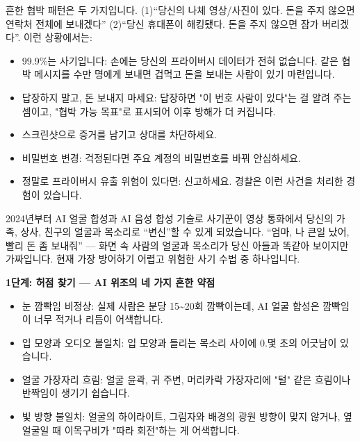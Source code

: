 
흔한 협박 패턴은 두 가지입니다. (1)“당신의 나체 영상/사진이 있다. 돈을 주지 않으면 연락처 전체에 보내겠다” (2)“당신 휴대폰이 해킹됐다. 돈을 주지 않으면 잠가 버리겠다”. 이런 상황에서는:

\begin{itemize}
  \item 99.9\%는 사기입니다: 손에는 당신의 프라이버시 데이터가 전혀 없습니다. 같은 협박 메시지를 수만 명에게 보내면 겁먹고 돈을 보내는 사람이 있기 마련입니다.
  \item 답장하지 말고, 돈 보내지 마세요: 답장하면 "이 번호 사람이 있다"는 걸 알려 주는 셈이고, "협박 가능 목표"로 표시되어 이후 방해가 더 커집니다.
  \item 스크린샷으로 증거를 남기고 상대를 차단하세요.
  \item 비밀번호 변경: 걱정된다면 주요 계정의 비밀번호를 바꿔 안심하세요.
  \item 정말로 프라이버시 유출 위험이 있다면: 신고하세요. 경찰은 이런 사건을 처리한 경험이 있습니다.
\end{itemize}


2024년부터 AI 얼굴 합성과 AI 음성 합성 기술로 사기꾼이 영상 통화에서 당신의 가족, 상사, 친구의 얼굴과 목소리로 “변신”할 수 있게 되었습니다. “엄마, 나 큰일 났어, 빨리 돈 좀 보내줘” — 화면 속 사람의 얼굴과 목소리가 당신 아들과 똑같아 보이지만 가짜입니다. 현재 가장 방어하기 어렵고 위험한 사기 수법 중 하나입니다.

\textbf{1단계: 허점 찾기 — AI 위조의 네 가지 흔한 약점}\par

\begin{itemize}
  \item 눈 깜빡임 비정상: 실제 사람은 분당 15\textasciitilde{}20회 깜빡이는데, AI 얼굴 합성은 깜빡임이 너무 적거나 리듬이 어색합니다.
  \item 입 모양과 오디오 불일치: 입 모양과 들리는 목소리 사이에 0.몇 초의 어긋남이 있습니다.
  \item 얼굴 가장자리 흐림: 얼굴 윤곽, 귀 주변, 머리카락 가장자리에 "털" 같은 흐림이나 반짝임이 생기기 쉽습니다.
  \item 빛 방향 불일치: 얼굴의 하이라이트, 그림자와 배경의 광원 방향이 맞지 않거나, 옆얼굴일 때 이목구비가 "따라 회전"하는 게 어색합니다.
\end{itemize}

